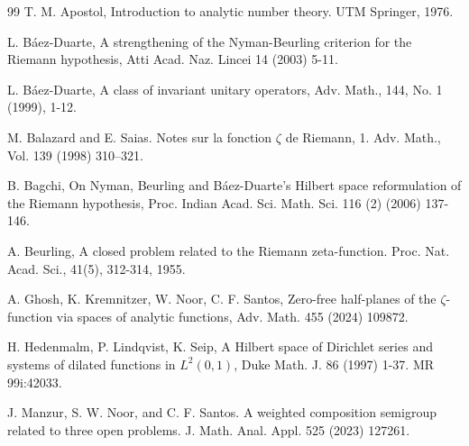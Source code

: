 \documentclass[11pt]{extarticle}
\numberwithin{equation}{section}
\theoremstyle{plain}
\theoremstyle{definition}
\begin{document}

\clearpage

\begin{thebibliography}{99}
    T. M. Apostol, Introduction to analytic number theory. UTM Springer, 1976.
	
	L. Báez-Duarte, A strengthening of the Nyman-Beurling criterion for the Riemann hypothesis, Atti Acad. Naz. Lincei 14 (2003) 5-11.


  L. Báez-Duarte, A class of invariant unitary operators, Adv. Math., 144, No. 1 (1999), 1-12.

    M. Balazard and E. Saias. Notes sur la fonction $\zeta$ de Riemann, 1. Adv. Math., Vol. 139 (1998) 310–321.
    
	
	B. Bagchi, On Nyman, Beurling and Báez-Duarte's Hilbert space reformulation of the Riemann hypothesis, Proc. Indian Acad. Sci. Math. Sci. 116 (2) (2006) 137-146.

    A. Beurling, A closed problem related to the Riemann zeta-function. Proc. Nat. Acad. Sci., 41(5), 312-314, 1955.

    A. Ghosh, K. Kremnitzer, W. Noor, C. F. Santos, Zero-free half-planes of the $\zeta$-function via spaces of analytic functions, Adv. Math. 455 (2024) 109872.
	
	H. Hedenmalm, P. Lindqvist, K. Seip, A Hilbert space of Dirichlet series and systems of dilated functions in $L^{2}(0,1)$, Duke Math. J. 86 (1997) 1-37. MR 99i:42033.

    J. Manzur, S. W. Noor, and C. F. Santos. A weighted composition semigroup related to three open problems. J. Math. Anal. Appl. 525 (2023) 127261.
	

\end{thebibliography}
\end{document}
